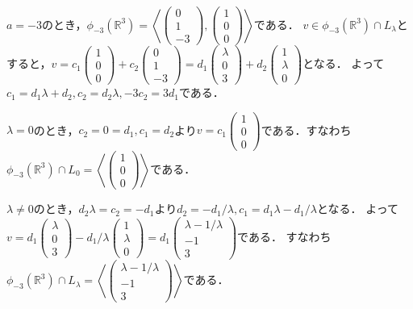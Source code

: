 \documentclass[
		book,
		head_space=20mm,
		foot_space=20mm,
		gutter=10mm,
		line_length=190mm
]{jlreq}
\begin{document}
$a=-3$のとき，$\phi_{-3}(\mathbb{R}^3)=\left\langle \begin{pmatrix}
	0 \\
	1 \\
	-3	
\end{pmatrix}, \begin{pmatrix}
	1 \\
	0 \\
	0
\end{pmatrix}\right\rangle$である．
$v\in \phi_{-3}(\mathbb{R}^3)\cap L_\lambda$とすると，$v=c_1\begin{pmatrix}
	1 \\
	0 \\
	0
\end{pmatrix}+c_2\begin{pmatrix}
	0 \\
	1 \\
	-3
\end{pmatrix}=d_1\begin{pmatrix}
	\lambda \\
	0 \\
	3
	\end{pmatrix}+d_2\begin{pmatrix}
		1 \\
		\lambda \\
		0
	\end{pmatrix}$となる．
	よって$c_1=d_1\lambda+d_2,c_2=d_2\lambda,-3c_2=3d_1$である．

	$\lambda=0$のとき，$c_2=0=d_1,c_1=d_2$より$v=c_1\begin{pmatrix}
		1 \\
		0 \\
		0
	\end{pmatrix}$である．すなわち$\phi_{-3}(\mathbb{R}^3)\cap L_0=\left\langle \begin{pmatrix}
		1 \\
		0 \\
		0
	\end{pmatrix}\right\rangle$である．

	$\lambda\neq 0$のとき，$d_2\lambda=c_2=-d_1$より$d_2=-d_1/\lambda,c_1=d_1\lambda-d_1/\lambda$となる．
	よって$v=d_1\begin{pmatrix}
		\lambda \\
		0 \\
		3
	\end{pmatrix}-d_1/\lambda\begin{pmatrix}
		1 \\
		\lambda \\
		0
	\end{pmatrix}=d_1\begin{pmatrix}
		\lambda-1/\lambda \\
		-1 \\
		3
	\end{pmatrix}$である．
	すなわち$\phi_{-3}(\mathbb{R}^3)\cap L_\lambda=\left\langle \begin{pmatrix}
		\lambda-1/\lambda \\
		-1 \\
		3
	\end{pmatrix}\right\rangle$である．
\end{document}
